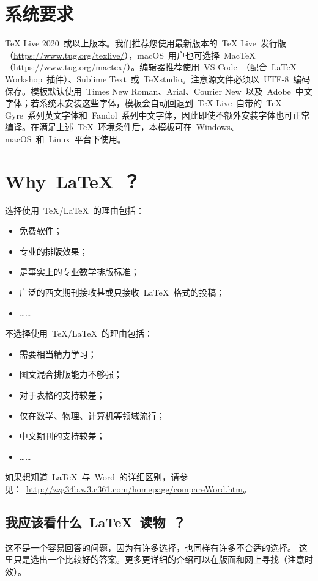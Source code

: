 \section{系统要求}

     TeX Live 2020~或以上版本。我们推荐您使用最新版本的~TeX Live~发行版（\url{https://www.tug.org/texlive/}），macOS~用户也可选择~MacTeX（\url{https://www.tug.org/mactex/}）。编辑器推荐使用~VS Code~（配合~LaTeX Workshop~插件）、Sublime Text~或~TeXstudio。注意源文件必须以~UTF-8~编码保存。模板默认使用~Times New Roman、Arial、Courier New~以及~Adobe~中文字体；若系统未安装这些字体，模板会自动回退到~TeX Live~自带的~TeX Gyre~系列英文字体和~Fandol~系列中文字体，因此即使不额外安装字体也可正常编译。在满足上述~\TeX~环境条件后，本模板可在~Windows、macOS~和~Linux~平台下使用。

\section{Why~\LaTeX~？}

选择使用~\TeX/\LaTeX~的理由包括：
\begin{itemize}
\item 免费软件；
\item 专业的排版效果；
\item 是事实上的专业数学排版标准；
\item 广泛的西文期刊接收甚或只接收~\LaTeX~格式的投稿；
\item[] ……
\end{itemize}
不选择使用~\TeX/\LaTeX~的理由包括：
\begin{itemize}
\item 需要相当精力学习；
\item 图文混合排版能力不够强；
\item 对于表格的支持较差；
\item 仅在数学、物理、计算机等领域流行；
\item 中文期刊的支持较差；
\item[] ……
\end{itemize}

如果想知道~\LaTeX~与~Word~的详细区别，请参见：~\url{http://zzg34b.w3.c361.com/homepage/compareWord.htm}。

\subsection{我应该看什么~\LaTeX~读物~？}

这不是一个容易回答的问题，因为有许多选择，也同样有许多不合适的选择。
这里只是选出一个比较好的答案。更多更详细的介绍可以在版面和网上寻找（注意时效）。

